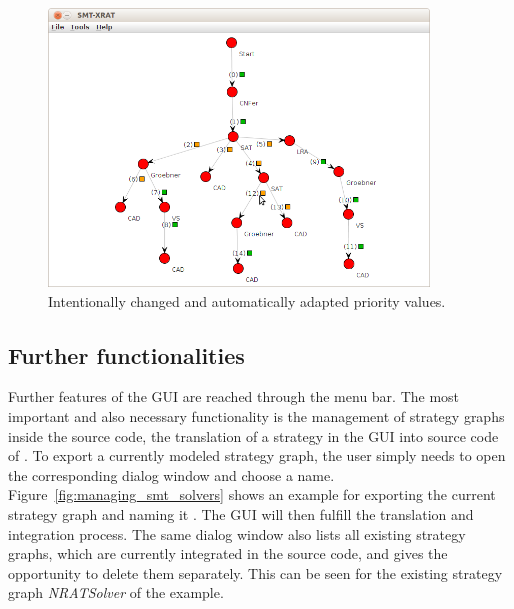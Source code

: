 \begin{figure}
  \begin{center}
    \includegraphics[width=0.9\textwidth]{graphics/smt-xrat_priority_b.png}
  \end{center}
  \caption{Intentionally changed and automatically adapted priority values.}
  \label{fig:smt-xrat_priority_b}
\end{figure}

\subsection{Further functionalities}
\label{sec:further_functionalities}
Further features of the GUI are reached through the menu bar. The most important
and also necessary functionality is the management of strategy graphs inside
the \smtrat source code, \eg the translation of a strategy in the GUI into source code
of \smtrat. To export a currently modeled strategy graph, the user simply needs 
to open the corresponding dialog window and choose a name. Figure~\ref{fig:managing_smt_solvers}
shows an example for exporting the current strategy graph and naming it 
\smtxrat. The GUI will then fulfill the translation and integration process. 
The same dialog window also lists all existing strategy graphs, which are currently 
integrated in the source code, and gives the opportunity to delete them separately.
This can be seen for the existing strategy graph \emph{NRATSolver} of the example.

